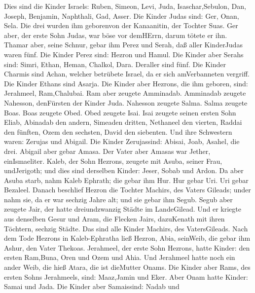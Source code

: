  Dies sind die Kinder Israels: Ruben, Simeon, Levi, Juda,
Isaschar,Sebulon,  Dan, Joseph, Benjamin, Naphthali, Gad,
Asser.  Die Kinder Judas sind: Ger, Onan, Sela. Die drei
wurden ihm geborenvon der Kanaanitin, der Tochter Suas. Ger aber, der
erste Sohn Judas, war böse vor demHErrn, darum tötete er ihn.
 Thamar aber, seine Schnur, gebar ihm Perez und Serah, daß
aller KinderJudas waren fünf.  Die Kinder Perez sind: Hezron
und Hamul.  Die Kinder aber Serahs sind: Simri, Ethan,
Heman, Chalkol, Dara. Deraller sind fünf.  Die Kinder
Charmis sind Achan, welcher betrübete Israel, da er sich amVerbanneten
vergriff.  Die Kinder Ethans sind Asarja.  Die
Kinder aber Hezrons, die ihm geboren, sind: Jerahmeel, Ram,Chalubai.
 Ram aber zeugete Amminadab. Amminadab zeugete Nahesson,
denFürsten der Kinder Juda.  Nahesson zeugete Salma. Salma
zeugete Boas.  Boas zeugete Obed. Obed zeugete Isai.
 Isai zeugete seinen ersten Sohn Eliab, Abinadab den
andern, Simeaden dritten,  Nethaneel den vierten, Raddai
den fünften,  Ozem den sechsten, David den siebenten.
 Und ihre Schwestern waren: Zerujas und Abigail. Die Kinder
Zerujassind: Abisai, Joab, Asahel, die drei.  Abigail aber
gebar Amasa. Der Vater aber Amasas war Jether, einIsmaeliter.
 Kaleb, der Sohn Hezrons, zeugete mit Asuba, seiner Frau,
undJerigoth; und dies sind derselben Kinder: Jeser, Sobab und Ardon.
 Da aber Asuba starb, nahm Kaleb Ephrath; die gebar ihm
Hur.  Hur gebar Uri. Uri gebar Bezaleel. 
Danach beschlief Hezron die Tochter Machirs, des Vaters Gileads; under
nahm sie, da er war sechzig Jahre alt; und sie gebar ihm Segub.
 Segub aber zeugete Jair, der hatte dreiundzwanzig Städte
im LandeGilead.  Und er kriegte aus denselben Gesur und
Aram, die Flecken Jairs, dazuKenath mit ihren Töchtern, sechzig Städte.
Das sind alle Kinder Machirs, des VatersGileads.  Nach dem
Tode Hezrons in Kaleb-Ephratha ließ Hezron, Abia, seinWeib, die gebar
ihm Ashur, den Vater Thekoas.  Jerahmeel, der erste Sohn
Hezrons, hatte Kinder: den ersten Ram,Buna, Oren und Ozem und Ahia.
 Und Jerahmeel hatte noch ein ander Weib, die hieß Atara,
die ist dieMutter Onams.  Die Kinder aber Rams, des ersten
Sohns Jerahmeels, sind: Maaz,Jamin und Eker.  Aber Onam
hatte Kinder: Samai und Jada. Die Kinder aber Samaissind: Nadab und
